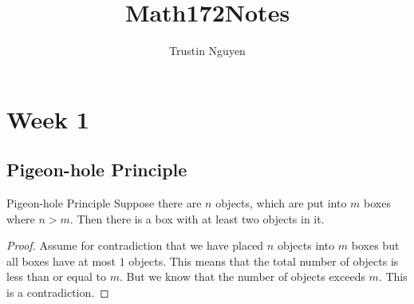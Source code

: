 \documentclass{report}
\title{Math172Notes}
\author{Trustin Nguyen}
\begin{document}

\begin{titlepage}
    \maketitle
\end{titlepage}
\tableofcontents
\restoregeometry

\reversemarginpar

\chapter{Week 1}

\begin{topic}
    \section{Pigeon-hole Principle}
\end{topic}

\begin{theorem}{Pigeon-hole Principle}
    Suppose there are $n$ objects, which are put into $m$ boxes where $n > m$. Then there is a box with at least two objects in it.
\end{theorem}

\begin{proof}
    Assume for contradiction that we have placed $n$ objects into $m$ boxes but all boxes have at most $1$ objects. This means that the total number of objects is less than or equal to $m$. But we know that the number of objects exceeds $m$. This is a contradiction.
\end{proof}
\end{document}
